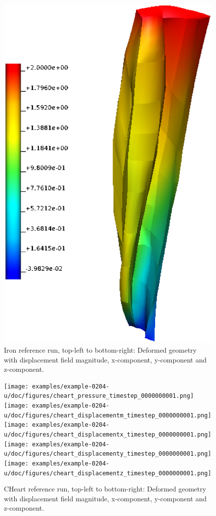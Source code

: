 \begin{figure}[h!]
    \includegraphics[width=0.49\columnwidth]{examples/example-0204-u/doc/figures/deformed_geometry-displacementZ.eps}
    \caption{Iron reference run, top-left to bottom-right: Deformed geometry with displacement field magnitude, x-component, y-component and z-component.}
    \label{example-0204-u-iron-reference-deformed-geometry-displacement-fig}
\end{figure}
%
\begin{figure}[h!]
    \centering
    \texttt{[image: examples/example-0204-u/doc/figures/cheart\_pressure\_timestep\_0000000001.png]}~\\
    \texttt{[image: examples/example-0204-u/doc/figures/cheart\_displacementm\_timestep\_0000000001.png]}
    \texttt{[image: examples/example-0204-u/doc/figures/cheart\_displacementx\_timestep\_0000000001.png]}
    \texttt{[image: examples/example-0204-u/doc/figures/cheart\_displacementy\_timestep\_0000000001.png]}
    \texttt{[image: examples/example-0204-u/doc/figures/cheart\_displacementz\_timestep\_0000000001.png]}
    \caption{CHeart reference run, top-left to bottom-right: Deformed geometry with displacement field magnitude, x-component, y-component and z-component.}
    \label{example-0204-u-cheart-reference-deformed-geometry-displacement-fig}
\end{figure}
%
